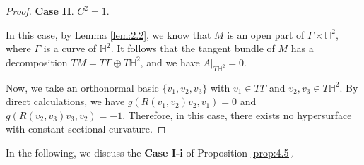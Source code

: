 \documentclass[reqno]{amsart}%
\theoremstyle{definition}
\newtheorem{remark}{Remark}[section]
\numberwithin{equation}{section}
\begin{document}
\begin{proof}
{\bf Case II}. $C^2=1$.

In this case, by Lemma \ref{lem:2.2}, we know that $M$ is an open part of
$\Gamma\times \mathbb{H}^2$, where $\Gamma$
is a curve of $\mathbb{H}^2$. It follows that the tangent bundle of $M$ has
a decomposition $TM=T\Gamma\oplus T\mathbb{H}^2$,
and we have $A|_{T\mathbb{H}^2}=0$.

Now, we take an orthonormal basic $\{v_1,v_2,v_3\}$ with $v_1\in T\Gamma$ and $v_2,v_3\in T\mathbb{H}^2$.
By direct calculations, we have $g(R(v_1,v_2)v_2,v_1)=0$ and $g(R(v_2,v_3)v_3,v_2)=-1$.
Therefore, in this case, there exists no hypersurface with constant sectional curvature.
\end{proof}


In the following, we discuss the {\bf Case I-i} of Proposition \ref{prop:4.5}.
\end{document}
